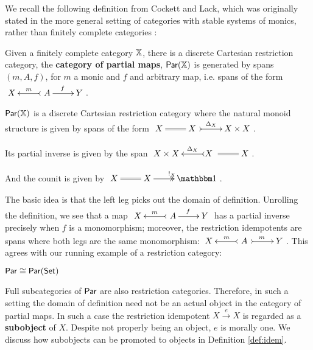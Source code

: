 \begin{theorem}
%
\end{theorem}
We recall the following definition from Cockett and Lack, which was originally stated in the more general setting of categories with stable systems of monics, rather than finitely complete categories \cite[\S 3]{cockett}:
\begin{definition}
\label{def:par}
Given a finitely complete category $\mathbb{X}$,  there is a discrete Cartesian restriction category, the {\bf category of partial maps}, $\mathsf{Par}(\mathbb{X})$ is generated by spans $(m,A,f)$, for $m$ a monic and $f$ and arbitrary map, i.e. spans of the form
$
\xymatrix{
X 
&
\ A \ar@{>->}[l]_m \ar[r]^{f}
&
Y
}
$.

 $\mathsf{Par}(\mathbb{X})$ is a discrete Cartesian restriction category where the natural monoid structure is given by spans of the form 
$
\xymatrix{
X 
&
X \ \ar@{=}[l] \ar@{>->}[r]^{\Delta_X \ \ \ }
&
X\times X
}
$.


Its partial inverse is given by the span  
$
\xymatrix{
X \times X
&
X \ \ar@{=}[r] \ar@{>->}[l]_{\ \ \ \Delta_X}
&
X
}
$.

And the counit is given by 
$
\xymatrix{
X 
&
X \ar@{=}[l] \ar@{->>}[r]^{!_X}
&
\one
}
$.
\end{definition}
The basic idea is that the left leg picks out the domain of definition.  
Unrolling the definition, we see that a map
$
\xymatrix{
X 
&
\ A  \ar@{>->}[l]_m \ar[r]^{f}
&
Y
}
$ 
has a partial inverse precisely when $f$ is a monomorphism; moreover, the restriction idempotents are spans where both legs are the same monomorphism:
$
\xymatrix{
X 
&
\ A\  \ar@{>->}[l]_m \ar@{>->}[r]^{m}
&
Y
}
$.
This agrees with our running example of a restriction category:
\begin{example}
$\mathsf{Par}\cong\mathsf{Par}(\mathsf{Set})$
\end{example}
Full subcategories of $\mathsf{Par}$ are also restriction categories.  Therefore, in such a setting the domain of definition need not be an actual object in the category of partial maps.  In such a case the restriction idempotent $X\xrightarrow{e}X$ is regarded as a {\bf subobject} of $X$.  Despite not properly being an object, $e$ is morally one.  We discuss how subobjects can be promoted to objects in Definition \ref{def:idem}.


